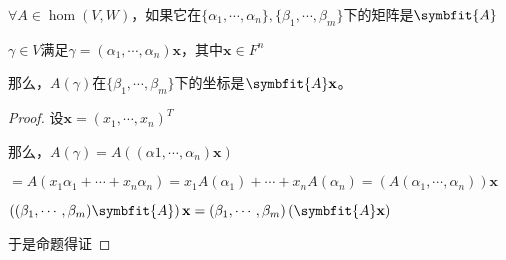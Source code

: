 \documentclass[12pt, a4paper, oneside, UTF8]{ctexbook}
\begin{document}
\begin{para}{0}
\begin{proposition}
						$\forall A \in \hom(V,W)$，如果它在$\{\alpha _1,\cdots,\alpha _n\},\{\beta _1,\cdots,\beta _m\}$下的矩阵是$\symbfit{A}$

						$\gamma \in V$满足$\gamma =(\alpha_1,\cdots,\alpha_n)\mathbf{x}$，其中$\mathbf{x} \in F^n$

						那么，$A(\gamma )$在$\{\beta_1,\cdots,\beta_m\}$下的坐标是$\symbfit{A}\mathbf{x}$。
					\end{proposition}
					\begin{proof}
						设$\mathbf{x} = (x_1,\cdots,x_n)^T$

						那么，$A(\gamma )=A\left((\alpha 1,\cdots,\alpha _n)\mathbf{x}\right)$

						$=A(x_1\alpha _1+\cdots+x_n\alpha _n)=x_1A(\alpha _1)+\cdots+x_nA(\alpha _n)=\left(A(\alpha _1,\cdots,\alpha _n)\right)\mathbf{x}$

						$\left((\beta_1,\cdots,\beta_m)\symbfit{A}\right)\mathbf{x}=(\beta_1,\cdots,\beta_m)\left(\symbfit{A}\mathbf{x}\right)$

						于是命题得证
					\end{proof}
			\end{para}
\end{document}
